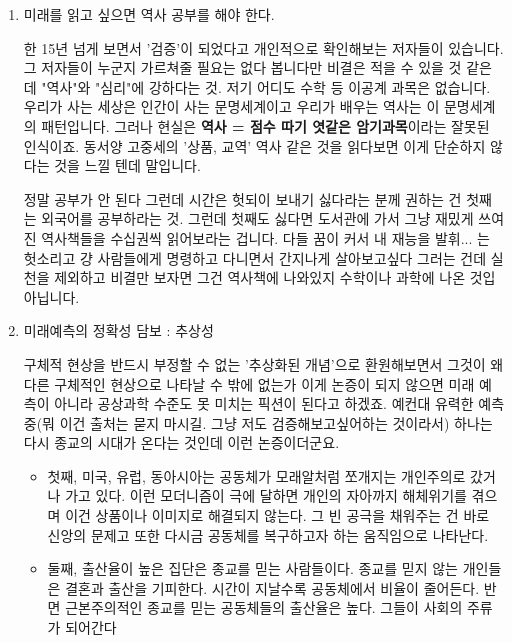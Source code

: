 \begin{enumerate}
    \item 미래를 읽고 싶으면 역사 공부를 해야 한다.
    \vspace{5mm}

    한 15년 넘게 보면서 '검증'이 되었다고 개인적으로 확인해보는 저자들이 있습니다.
    그 저자들이 누군지 가르쳐줄 필요는 없다 봅니다만 비결은 적을 수 있을 것 같은데 "역사"와 "심리"에 강하다는 것.
    저기 어디도 수학 등 이공계 과목은 없습니다. 우리가 사는 세상은 인간이 사는 문명세계이고
    우리가 배우는 역사는 이 문명세계의 패턴입니다. 그러나 현실은 \textbf{역사 = 점수 따기 엿같은 암기과목}이라는 잘못된 인식이죠.
    동서양 고중세의 '상품, 교역' 역사 같은 것을 읽다보면 이게 단순하지 않다는 것을 느낄 텐데 말입니다.
    \vspace{5mm}

    정말 공부가 안 된다 그런데 시간은 헛되이 보내기 싫다라는 분께 권하는 건
    첫째는 외국어를 공부하라는 것.
    그런데 첫째도 싫다면 도서관에 가서 그냥 재밌게 쓰여진 역사책들을 수십권씩 읽어보라는 겁니다.
    다들 꿈이 커서 내 재능을 발휘... 는 헛소리고 걍 사람들에게 명령하고 다니면서 간지나게 살아보고싶다 그러는 건데
    실천을 제외하고 비결만 보자면 그건 역사책에 나와있지 수학이나 과학에 나온 것입 아닙니다.
    \vspace{5mm}

    \item 미래예측의 정확성 담보 : 추상성
    \vspace{5mm}

    구체적 현상을 반드시 부정할 수 없는 '추상화된 개념'으로 환원해보면서 그것이 왜 다른 구체적인 현상으로 나타날 수 밖에 없는가
    이게 논증이 되지 않으면 미래 예측이 아니라 공상과학 수준도 못 미치는 픽션이 된다고 하겠죠.
    예컨대 유력한 예측 중(뭐 이건 출처는 묻지 마시길. 그냥 저도 검증해보고싶어하는 것이라서)
    하나는 다시 종교의 시대가 온다는 것인데 이런 논증이더군요.
    \vspace{5mm}

    \begin{itemize}
        \item 첫째, 미국, 유럽, 동아시아는 공동체가 모래알처럼 쪼개지는 개인주의로 갔거나 가고 있다.
        이런 모더니즘이 극에 달하면 개인의 자아까지 해체위기를 겪으며 이건 상품이나 이미지로 해결되지 않는다.
        그 빈 공극을 채워주는 건 바로 신앙의 문제고 또한 다시금 공동체를 복구하고자 하는 움직임으로 나타난다.
        \vspace{5mm}
        
        \item 둘째, 출산율이 높은 집단은 종교를 믿는 사람들이다.
        종교를 믿지 않는 개인들은 결혼과 출산을 기피한다. 시간이 지날수록 공동체에서 비율이 줄어든다.
        반면 근본주의적인 종교를 믿는 공동체들의 출산율은 높다. 그들이 사회의 주류가 되어간다
        \vspace{5mm}
    \end{itemize}


\end{enumerate}
